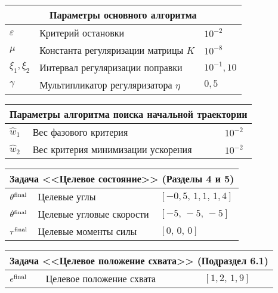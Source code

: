 \documentclass[../../doc.tex]{subfiles}
\begin{document}
    \begin{flushleft}\begin{tabular}{|p{2cm}|p{9.7cm}|p{4cm}|}
        \hline
        \multicolumn{3}{|c|}{Параметры основного алгоритма}
        \\\hline\hline
        $\varepsilon$ & Критерий остановки & $10^{-2}$
        \\ \hline
        $\mu$ & Константа регуляризации матрицы $K$ & $10^{-8}$
        \\ \hline
        $\xi_1, \xi_2$ & Интервал регуляризации поправки & $10^{-1}, 10$
        \\ \hline
        $\gamma$ & Мультипликатор регуляризатора $\eta$ & $0,\!5$
        \\ \hline
    \end{tabular}\end{flushleft}

    \begin{flushleft}\begin{tabular}{|p{2cm}|p{9.7cm}|p{4cm}|}
        \hline
        \multicolumn{3}{|c|}{Параметры алгоритма поиска начальной траектории}
        \\ \hline\hline
        $\hat w_1$ & Вес фазового критерия & $10^{-2}$
        \\ \hline
        $\hat w_2$ & Вес критерия минимизации ускорения & $10^{-2}$
        \\ \hline
    \end{tabular}\end{flushleft}


    \begin{flushleft}\begin{tabular}{|p{2cm}|p{9.7cm}|p{4cm}|}
        \hline
        \multicolumn{3}{|c|}{Задача <<Целевое состояние>> (Разделы 4 и 5)}
        \\ \hline\hline
        $\theta^{\textnormal{final}}$ & Целевые углы & $[-0,\!5,\, 1,\!1,\, 1,\!4]$
        \\ \hline
        $\dot \theta^{\textnormal{final}}$ & Целевые угловые скорости & $[ -5,\, -5,\, -5]$
        \\ \hline
        $\tau^{\textnormal{final}}$ & Целевые моменты силы & $[0,\,0,\,0]$
        \\ \hline
    \end{tabular}\end{flushleft}

    \begin{flushleft}\begin{tabular}{|p{2cm}|p{9.7cm}|p{4cm}|}
        \hline
        \multicolumn{3}{|c|}{Задача <<Целевое положение схвата>> (Подраздел 6.1)}
        \\ \hline\hline
        $e^{\textnormal{final}}$ & Целевое положение схвата & $[1,\!2,\,1,\!9]$
        \\ \hline
    \end{tabular}\end{flushleft}
\end{document}
